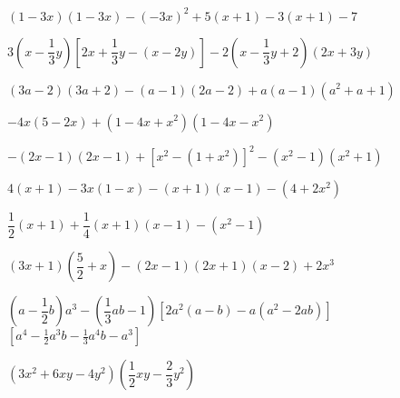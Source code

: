 \begin{esercizio}[\Ast]
\begin{enumeratea}
% 
 \item \((1-3x)(1-3x)-(-3x)^{2}+5(x+1)-3(x+1)-7\)
 \item 
\(3\left(x-\dfrac{1}{3}y\right)\left[2x+\dfrac{1}{3}y-(x-2y)\right]
-2\left(x-\dfrac{1}{3}y+2\right)(2x+3y)\)
 \item \((3a-2)(3a+2)-(a-1)(2a-2)+a(a-1)\left(a^{2}+a+1\right)\)
 \item \(-4x(5-2x)+\left(1-4x+x^{2}\right)\left(1-4x-x^{2}\right)\)
 \item 
\(-(2x-1)(2x-1)+\left[x^{2}-\left(1+x^{2}\right)\right]^{2}-\left(x^{2}
-1\right)\left(x^{2}+1\right)\)
% 
 \item \(4(x+1)-3x(1-x)-(x+1)(x-1)-\left(4+2x^{2}\right)\)
 \item \(\dfrac{1}{2}(x+1)+\dfrac{1}{4}(x+1)(x-1)-\left(x^{2}-1\right)\)
 \item \((3x+1)\left(\dfrac{5}{2}+x\right)-(2x-1)(2x+1)(x-2)+2x^{3}\)
 \item \(\left(a-\dfrac{1}{2}b\right)a^{3}-\left(\dfrac{1}{3}{ab}-1\right)
 \left[2a^{2}(a-b)-a\left(a^{2}-2{ab}\right)\right]\)
  \hfill \(\left[a^{4}-\frac{1}{2}a^{3}b-\frac{1}{3}a^{4}b-a^{3}\right]\)
 \item \(\left(3x^2+6xy-4y^2\right)\left(\dfrac{1}{2}xy-\dfrac{2}{3}y^2\right)\)

\end{enumeratea}
\end{esercizio}

